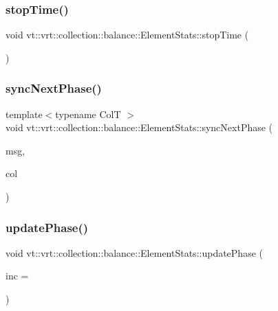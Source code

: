 \subsubsection{\texorpdfstring{stop\+Time()}{stopTime()}}
{\footnotesize\ttfamily void vt\+::vrt\+::collection\+::balance\+::\+Element\+Stats\+::stop\+Time (\begin{DoxyParamCaption}{ }\end{DoxyParamCaption})}

\mbox{\label{structvt_1_1vrt_1_1collection_1_1balance_1_1_element_stats_a8238b75b708497ec5969235c52b2d338}} 
\subsubsection{\texorpdfstring{sync\+Next\+Phase()}{syncNextPhase()}}
{\footnotesize\ttfamily template$<$typename ColT $>$ \\
void vt\+::vrt\+::collection\+::balance\+::\+Element\+Stats\+::sync\+Next\+Phase (\begin{DoxyParamCaption}\item[{\hyperlink{namespacevt_1_1vrt_1_1collection_1_1balance_a7120dc064f6e8c4157a5f4c81b825393}{Phase\+Msg}$<$ ColT $>$ $\ast$}]{msg,  }\item[{ColT $\ast$}]{col }\end{DoxyParamCaption})\hspace{0.3cm}{\ttfamily [static]}}

\mbox{\label{structvt_1_1vrt_1_1collection_1_1balance_1_1_element_stats_a6ba8726a871702870d76dca6de298d07}} 
\subsubsection{\texorpdfstring{update\+Phase()}{updatePhase()}}
{\footnotesize\ttfamily void vt\+::vrt\+::collection\+::balance\+::\+Element\+Stats\+::update\+Phase (\begin{DoxyParamCaption}\item[{\hyperlink{structvt_1_1vrt_1_1collection_1_1balance_1_1_element_stats_a6edee983bb2ae96a341763520af33c66}{Phase\+Type} const \&}]{inc = {} }\end{DoxyParamCaption})}



